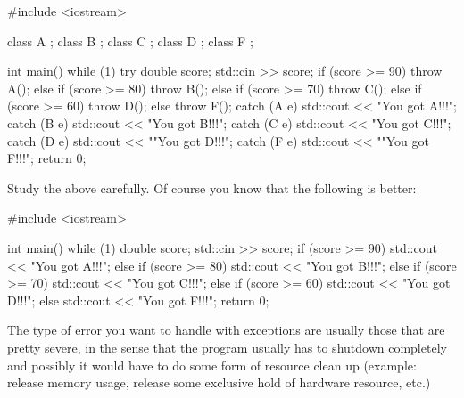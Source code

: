 \begin{console}
#include <iostream>

class A {};
class B {};
class C {};
class D {};
class F {};

int main()
{   
    while (1)
    {     
          try
          {
               double score;
               std::cin >> score;
               if (score >= 90)
               {
                    throw A();
               }
               else if (score >= 80)
               {
                    throw B();
               }
               else if (score >= 70)
               {
                    throw C();
               }
               else if (score >= 60)
               {
                    throw D();
               }
               else
               {
                    throw F();
               }
          }
          catch (A e)
          {
               std::cout << "You got A!!!\n";
          }
          catch (B e)
          {
               std::cout << "You got B!!!\n";
          }
          catch (C e)
          {
               std::cout << "You got C!!!\n";
          }
          catch (D e)
          {         
               std::cout << ""You got D!!!\n";
          }
          catch (F e)
          {
               std::cout << ""You got
               F!!!\n";
          }
    }
    return 0;
}
\end{console}

Study the above carefully. Of course you know that the following is
better:

\begin{console}
#include <iostream>

int main()
{   
    while (1)
    {
        double score;
        std::cin >> score;
        if (score >= 90)
        {   
           std::cout << "You got A!!!\n";
        }
        else if (score >= 80)
        {
           std::cout << "You got B!!!\n";
        }
        else if (score >= 70)
        {
           std::cout << "You got C!!!\n";
        }
        else if (score >= 60)
        {
           std::cout << "You got D!!!\n";
        }
        else
        {
           std::cout << "You got F!!!\n";
        }
    }
    return 0;
}
\end{console}

The type of error you want to handle with exceptions are usually those
that are pretty severe, in the sense that the program usually has to
shutdown completely and possibly it would have to do some form of
resource clean up (example: release memory usage, release some exclusive
hold of hardware resource, etc.)

